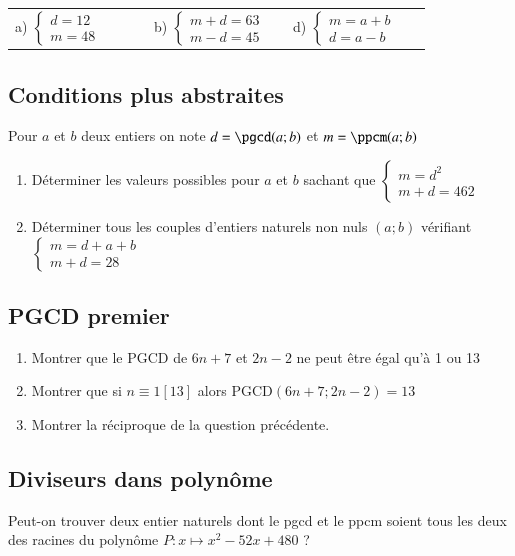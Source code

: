 \documentclass[oneside,12pt]{article}          %
\begin{document}
\begin{tabular}{p{0.3\linewidth}p{0.3\linewidth}p{0.3\linewidth}}
    a) $\begin{cases}d=12\\m=48\end{cases}$ & b) $\begin{cases}m+d=63\\m-d=45\end{cases}$ & d) $\begin{cases}m=a+b\\d=a-b\end{cases}$
\end{tabular}



\subsection{Conditions plus abstraites}
Pour $a$ et $b$ deux entiers on note $d=\pgcd(a;b)$ et $m=\ppcm(a;b)$
\begin{enumerate}
    \item Déterminer les valeurs possibles pour $a$ et $b$ sachant que $\begin{cases}m=d^2\\m+d=462\end{cases}$
    \item Déterminer tous les couples d'entiers naturels non nuls $(a;b)$ vérifiant $\begin{cases}
        m=d+a+b \\ m+d=28
    \end{cases}$
\end{enumerate}



\subsection{PGCD premier}
\begin{enumerate}
    \item Montrer que le PGCD de $6n+7$ et $2n-2$ ne peut être égal qu'à 1 ou 13
    \item Montrer que si $n\equiv1[13]$ alors $\mathrm{PGCD}(6n+7;2n-2)=13$
	\item Montrer la réciproque de la question précédente.
\end{enumerate}



\subsection{Diviseurs dans polynôme}
Peut-on trouver deux entier naturels dont le pgcd et le ppcm soient tous les deux des racines du polynôme $P:x\mapsto x^2-52x+480$ ?
\end{document}
